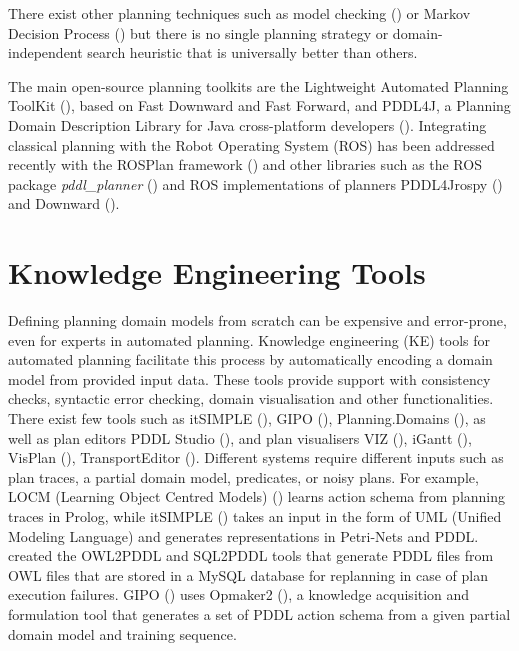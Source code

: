 There exist other planning techniques such as model checking (\cite{triantafillou2015unifying}) or Markov Decision Process (\cite{kolobov2012planning}) but there is no single planning strategy or domain-independent search heuristic that is universally better than others.

The main open-source planning toolkits are the Lightweight Automated Planning ToolKit (\cite{lapkt}), based on Fast Downward and Fast Forward, and PDDL4J, a Planning Domain Description Library for Java cross-platform developers (\cite{pellier2018pddl4j}).
Integrating classical planning with the Robot Operating System (ROS) has been addressed recently \eg with the ROSPlan framework (\cite{cashmore2015rosplan}) and other libraries such as the ROS package \textit{pddl_planner} (\cite{pddlplanner}) and ROS implementations of planners \eg PDDL4Jrospy (\cite{pddl4jrospy}) and Downward (\cite{downward}).


\section{Knowledge Engineering Tools}\label{subsec:Knowledge Engineering}
Defining planning domain models from scratch can be expensive and error-prone, even for experts in automated planning.
Knowledge engineering (KE) tools for automated planning facilitate this process by automatically encoding a domain model from provided input data.
These tools provide support with consistency checks, syntactic error checking, domain visualisation and other functionalities.
There exist few tools such as itSIMPLE (\cite{vaquero2013itsimple}), GIPO (\cite{simpson2007planning}), Planning.Domains (\cite{muise2016planning}), 
as well as plan editors \eg PDDL Studio (\cite{plch2012inspect}), and plan visualisers \eg VIZ (\cite{vodrazka2010visual}), iGantt (\cite{bartak2009local}), VisPlan (\cite{glinsky2011visplan}), TransportEditor (\cite{vskopek2017transporteditor}).
Different systems require different inputs such as plan traces, a partial domain model, predicates, or noisy plans.
For example, LOCM (Learning Object Centred Models) (\cite{cresswell2013acquiring}) learns action schema from planning traces in Prolog, 
while itSIMPLE () takes an input in the form of UML (Unified Modeling Language) %
and generates representations in Petri-Nets %
and PDDL. 
\cite{kootbally2015towards} created the OWL2PDDL and SQL2PDDL tools that generate PDDL files from OWL files that are stored in a MySQL database for replanning in case of plan execution failures.
GIPO () uses Opmaker2 (\cite{mccluskey2009automated}), a knowledge acquisition and formulation tool that generates a set of PDDL action schema from a given partial domain model and training sequence.

